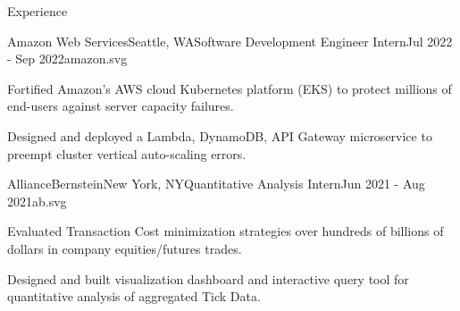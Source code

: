 \documentclass{ForrestBickerResume}
\begin{document}
    \begin{rSection}{Experience}

        \begin{rSubsection}{Amazon Web Services}{Seattle, WA}{Software Development Engineer Intern}{Jul 2022 - Sep 2022}{amazon.svg}
        \item Fortified Amazon's AWS cloud Kubernetes platform (EKS) to protect millions of end-users against server capacity failures.
        \item Designed and deployed a Lambda, DynamoDB, API Gateway microservice to preempt cluster vertical auto-scaling errors.
        \end{rSubsection}

        \begin{rSubsection}{AllianceBernstein}{New York, NY}{Quantitative Analysis Intern}{Jun 2021 - Aug 2021}{ab.svg}
        \item Evaluated Transaction Cost minimization strategies over hundreds of billions of dollars in company equities/futures trades.
        \item Designed and built visualization dashboard and interactive query tool for quantitative analysis of aggregated Tick Data.
        \end{rSubsection}


\end{rSection}
\end{document}

